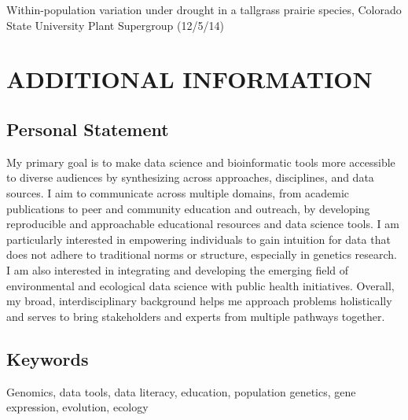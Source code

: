 \documentclass{cv}
\begin{document}
Within-population variation under drought in a tallgrass prairie species, Colorado State University Plant Supergroup (12/5/14)


\section*{ADDITIONAL INFORMATION}

\subsection*{Personal Statement}

My primary goal is to make data science and bioinformatic tools more accessible to diverse audiences by synthesizing across approaches, disciplines, and data sources. I aim to communicate across multiple domains, from academic publications to peer and community education and outreach, by developing reproducible and approachable educational resources and data science tools. I am particularly interested in empowering individuals to gain intuition for data that does not adhere to traditional norms or structure, especially in genetics research. I am also interested in integrating and developing the emerging field of environmental and ecological data science with public health initiatives. Overall, my broad, interdisciplinary background helps me approach problems holistically and serves to bring stakeholders and experts from multiple pathways together.

\subsection*{Keywords}

Genomics, data tools, data literacy, education, population genetics, gene expression, evolution, ecology
\end{document}
